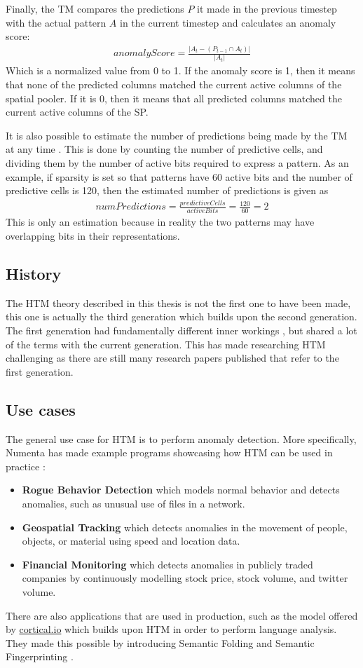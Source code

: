 \par
Finally, the TM compares the predictions $P$ it made in the previous timestep with the actual pattern $A$ in the current timestep and calculates an anomaly score:
\begin{align*}
    anomalyScore=\frac{|A_t-(P_{t-1}\cap A_t)|}{|A_t|}
\end{align*}
Which is a normalized value from 0 to 1. If the anomaly score is 1, then it means that none of the predicted columns matched the current active columns of the spatial pooler. If it is 0, then it means that all predicted columns matched the current active columns of the SP.\par
It is also possible to estimate the number of predictions being made by the TM at any time \cite{htm_predictions_count}. This is done by counting the number of predictive cells, and dividing them by the number of active bits required to express a pattern. As an example, if sparsity is set so that patterns have 60 active bits and the number of predictive cells is 120, then the estimated number of predictions is given as
\begin{align*}
    numPredictions=\frac{predictiveCells}{activeBits}=\frac{120}{60}=2
\end{align*}
This is only an estimation because in reality the two patterns may have overlapping bits in their representations.
\subsection{History}
The HTM theory described in this thesis is not the first one to have been made, this one is actually the third generation which builds upon the second generation. The first generation had fundamentally different inner workings \cite{htm_zeta1}, but shared a lot of the terms with the current generation. This has made researching HTM challenging as there are still many research papers published that refer to the first generation.
\subsection{Use cases}
The general use case for HTM is to perform anomaly detection. More specifically, Numenta has made example programs showcasing how HTM can be used in practice \cite{numenta_example_apps}:
\begin{itemize}
    \item \textbf{Rogue Behavior Detection} which models normal behavior and detects anomalies, such as unusual use of files in a network.
    \item \textbf{Geospatial Tracking} which detects anomalies in the movement of people, objects, or material using speed and location data.
    \item \textbf{Financial Monitoring} which detects anomalies in publicly traded companies by continuously modelling stock price, stock volume, and twitter volume.
\end{itemize}
There are also applications that are used in production, such as the model offered by \href{www.cortical.io}{cortical.io} which builds upon HTM in order to perform language analysis. They made this possible by introducing Semantic Folding and Semantic Fingerprinting \cite{semantic_folding}.
